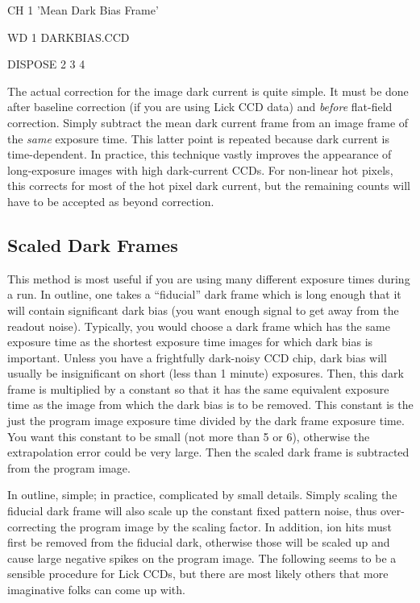 \begin{command}
      \item CH 1 'Mean Dark Bias Frame'
      \item WD 1 DARKBIAS.CCD
      \item DISPOSE 2 3 4
\end{command}

\noindent
The actual correction for the image dark current is quite simple.  It must be
done after baseline correction (if you are using Lick CCD data) and {\it
before} flat-field correction.  Simply subtract the mean dark current frame from
an image frame of the {\it same} exposure time.  This latter point is repeated
because dark current is time-dependent.  In practice, this technique vastly
improves the appearance of long-exposure images with high dark-current CCDs.  For
non-linear hot pixels, this corrects for most of the hot pixel dark current, but
the remaining counts will have to be accepted as beyond correction. 

\subsection{Scaled Dark Frames} 
\nobreak 
This method is most useful if you are using many different exposure times
during a run.  In outline, one takes a ``fiducial'' dark frame which is long
enough that it will contain significant dark bias (you want enough signal to
get away from the readout noise).  Typically, you would choose a dark frame
which has the same exposure time as the shortest exposure time images for
which dark bias is important.  Unless you have a frightfully dark-noisy CCD
chip, dark bias will usually be insignificant on short (less than 1 minute)
exposures.  Then, this dark frame is multiplied by a constant so that it has
the same equivalent exposure time as the image from which the dark bias is to
be removed.  This constant is the just the program image exposure time divided
by the dark frame exposure time. You want this constant to be small (not more
than 5 or 6), otherwise the extrapolation error could be very large.  Then
the scaled dark frame is subtracted from the program image.

In outline, simple; in practice, complicated by small details.  Simply scaling
the fiducial dark frame will also scale up the constant fixed pattern noise,
thus over-correcting the program image by the scaling factor.  In addition,
ion hits must first be removed from the fiducial dark, otherwise those will be
scaled up and cause large negative spikes on the program image.  The following
seems to be a sensible procedure for Lick CCDs, but there are most likely
others that more imaginative folks can come up with. 

